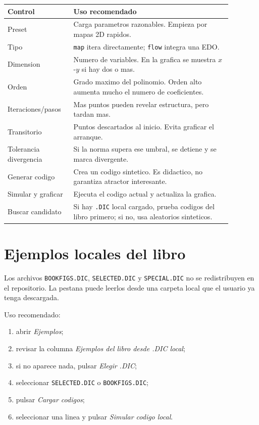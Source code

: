 \documentclass[11pt]{article}
\newcommand{\code}[1]{\texttt{#1}}
\begin{document}
\begin{longtable}{p{0.24\linewidth}p{0.64\linewidth}}
\toprule
Control & Uso recomendado \\
\midrule
\endhead
Preset & Carga parametros razonables. Empieza por mapas 2D rapidos. \\
Tipo & \code{map} itera directamente; \code{flow} integra una EDO. \\
Dimension & Numero de variables. En la grafica se muestra \(x\)-\(y\) si hay dos o mas. \\
Orden & Grado maximo del polinomio. Orden alto aumenta mucho el numero de coeficientes. \\
Iteraciones/pasos & Mas puntos pueden revelar estructura, pero tardan mas. \\
Transitorio & Puntos descartados al inicio. Evita graficar el arranque. \\
Tolerancia divergencia & Si la norma supera ese umbral, se detiene y se marca divergente. \\
Generar codigo & Crea un codigo sintetico. Es didactico, no garantiza atractor interesante. \\
Simular y graficar & Ejecuta el codigo actual y actualiza la grafica. \\
Buscar candidato & Si hay \code{.DIC} local cargado, prueba codigos del libro primero; si no, usa aleatorios sinteticos. \\
\bottomrule
\end{longtable}

\section{Ejemplos locales del libro}

Los archivos \code{BOOKFIGS.DIC}, \code{SELECTED.DIC} y \code{SPECIAL.DIC} no se
redistribuyen en el repositorio. La pestana puede leerlos desde una carpeta local que
el usuario ya tenga descargada.

Uso recomendado:
\begin{enumerate}
  \item abrir \emph{Ejemplos};
  \item revisar la columna \emph{Ejemplos del libro desde .DIC local};
  \item si no aparece nada, pulsar \emph{Elegir .DIC};
  \item seleccionar \code{SELECTED.DIC} o \code{BOOKFIGS.DIC};
  \item pulsar \emph{Cargar codigos};
  \item seleccionar una linea y pulsar \emph{Simular codigo local}.
\end{enumerate}
\end{document}

